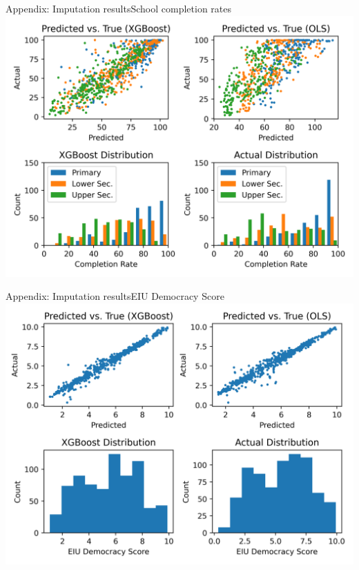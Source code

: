 \documentclass[10pt]{beamer}
\begin{document}
\begin{frame}{Appendix: Imputation results}{School completion rates}
    \centering
    \includegraphics[width=\textwidth]{../build/xgboost.png}
\end{frame}

\begin{frame}{Appendix: Imputation results}{EIU Democracy Score}
    \centering
    \includegraphics[width=\textwidth]{../build/eiu_xgboost.png}
\end{frame}
\end{document}
